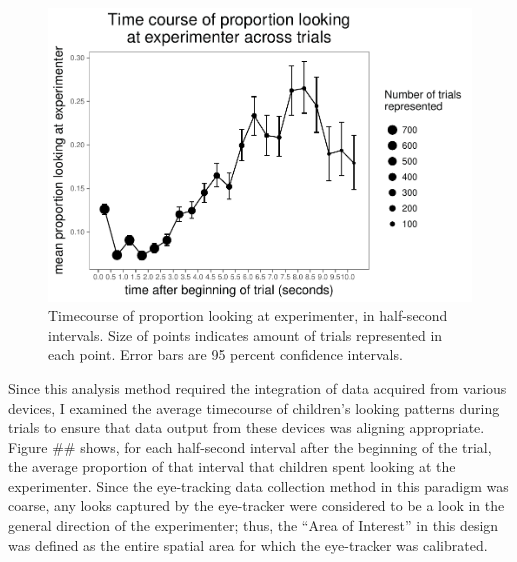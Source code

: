 \documentclass[man]{apa6}
\theoremstyle{definition}
\theoremstyle{definition}
\theoremstyle{definition}
\theoremstyle{remark}
\begin{document}
\begin{figure}
\centering
\includegraphics{soc_ref_category_paper_files/figure-latex/unnamed-chunk-9-1.pdf}
\caption{\label{fig:unnamed-chunk-9}Timecourse of proportion looking at
experimenter, in half-second intervals. Size of points indicates amount
of trials represented in each point. Error bars are 95 percent
confidence intervals.}
\end{figure}

Since this analysis method required the integration of data acquired
from various devices, I examined the average timecourse of children's
looking patterns during trials to ensure that data output from these
devices was aligning appropriate. Figure \#\# shows, for each
half-second interval after the beginning of the trial, the average
proportion of that interval that children spent looking at the
experimenter. Since the eye-tracking data collection method in this
paradigm was coarse, any looks captured by the eye-tracker were
considered to be a look in the general direction of the experimenter;
thus, the \enquote{Area of Interest} in this design was defined as the
entire spatial area for which the eye-tracker was calibrated.
\end{document}
